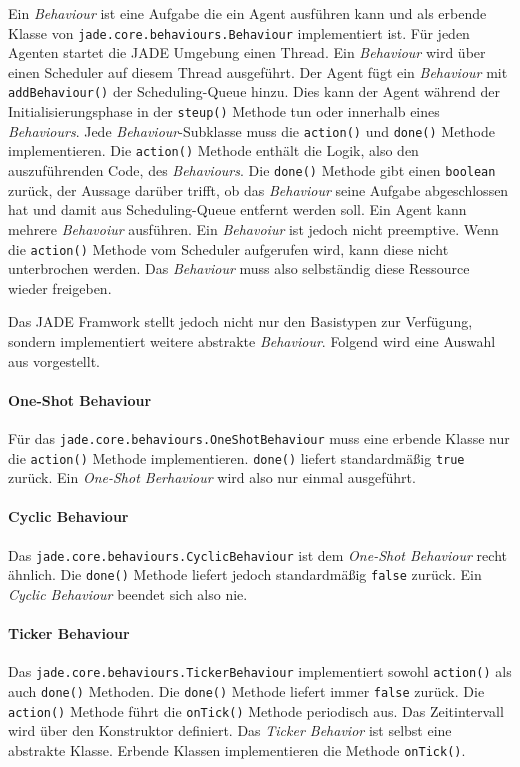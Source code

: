 Ein \textit{Behaviour} ist eine Aufgabe die ein Agent ausführen kann und als erbende Klasse von \texttt{jade.core.behaviours.Behaviour} implementiert ist. Für jeden Agenten startet die JADE Umgebung einen Thread. Ein \textit{Behaviour} wird über einen Scheduler auf diesem Thread ausgeführt. Der Agent fügt ein \textit{Behaviour} mit \texttt{addBehaviour()} der Scheduling-Queue hinzu. Dies kann der Agent während der Initialisierungsphase in der \texttt{steup()} Methode tun oder innerhalb eines \textit{Behaviours}. Jede \textit{Behaviour}-Subklasse muss die \texttt{action()} und \texttt{done()} Methode implementieren. Die \texttt{action()} Methode enthält die Logik, also den auszuführenden Code, des \textit{Behaviours}. Die \texttt{done()} Methode gibt einen \texttt{boolean} zurück, der Aussage darüber trifft, ob das \textit{Behaviour} seine Aufgabe abgeschlossen hat und damit aus Scheduling-Queue entfernt werden soll. Ein Agent kann mehrere \textit{Behavoiur} ausführen. Ein \textit{Behavoiur} ist jedoch nicht preemptive. Wenn die \texttt{action()} Methode vom Scheduler aufgerufen wird, kann diese nicht unterbrochen werden. Das \textit{Behaviour} muss also selbständig diese Ressource wieder freigeben. \cite{book:jade}

Das JADE Framwork stellt jedoch nicht nur den Basistypen zur Verfügung, sondern implementiert weitere abstrakte \textit{Behaviour}. Folgend wird eine Auswahl aus \cite{book:jade} vorgestellt.

\paragraph{One-Shot Behaviour}
Für das \texttt{jade.core.behaviours.OneShotBehaviour} muss eine erbende Klasse nur die \texttt{action()} Methode implementieren. \texttt{done()} liefert standardmäßig \texttt{true} zurück. Ein \textit{One-Shot Berhaviour} wird also nur einmal ausgeführt.

\paragraph{Cyclic Behaviour}
Das \texttt{jade.core.behaviours.CyclicBehaviour} ist dem \textit{One-Shot Behaviour} recht ähnlich. Die \texttt{done()} Methode liefert jedoch standardmäßig \texttt{false} zurück. Ein \textit{Cyclic Behaviour} beendet sich also nie.

\paragraph{Ticker Behaviour}
Das \texttt{jade.core.behaviours.TickerBehaviour} implementiert sowohl \texttt{action()} als auch \texttt{done()} Methoden. Die \texttt{done()} Methode liefert immer \texttt{false} zurück. Die \texttt{action()} Methode führt die \texttt{onTick()} Methode periodisch aus. Das Zeitintervall wird über den Konstruktor definiert. Das \textit{Ticker Behavior} ist selbst eine abstrakte Klasse. Erbende Klassen implementieren die Methode \texttt{onTick()}.